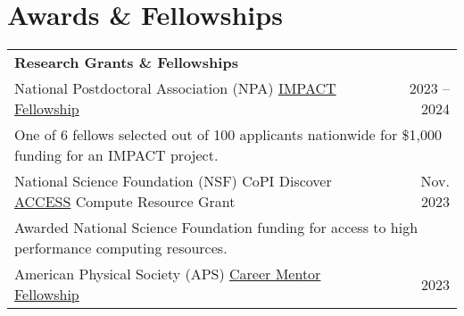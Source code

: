\documentclass[letterpaper,11pt]{article}
\begin{document}
%
\section*{Awards \& Fellowships}
\vspace{-0.4\baselineskip}
\begin{longtable}{@{}p{}r@{}}
  \multicolumn{2}{l}{\hspace{-3mm} \bf{Research Grants \& Fellowships}} 	                                                                                                                                                                                   \\ [5pt]
  \hspace{3mm} National Postdoctoral Association (NPA) \href{https://www.nationalpostdoc.org/general/custom.asp?page=IMPACTProgram}{IMPACT Fellowship}                                                                                              & 2023 -- 2024 \\ [4pt]
    \multicolumn{2}{l}{\hspace{4mm} One of 6 fellows selected out of 100 applicants nationwide for \$1,000 funding for an IMPACT project.}                                                                                                                         \\ [8pt]
  \hspace{3mm} National Science Foundation (NSF) CoPI Discover \href{https://access-ci.org/}{ACCESS} Compute Resource Grant                                                                                                                         & Nov. 2023    \\ [4pt]
    \multicolumn{2}{l}{\hspace{4mm} Awarded National Science Foundation funding for access to high performance computing resources.}                                                                                                                               \\ [8pt]
  \hspace{3mm} American Physical Society (APS) \href{https://www.aps.org/careers/guidance/mentoring.cfm}{Career Mentor Fellowship}                                                                                                                  & 2023         \\ [4pt]

\end{longtable}
\end{document}
